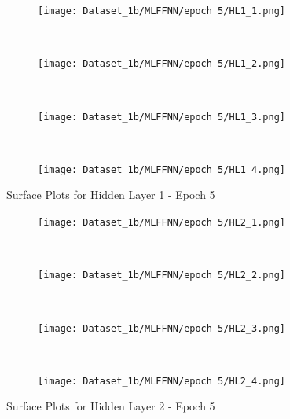 \begin{figure}[!ht]
    \centering
    \begin{subfigure}[h]{0.5\textwidth}
        \centering
        \texttt{[image: Dataset\_1b/MLFFNN/epoch 5/HL1\_1.png]}
    \end{subfigure}%
    ~ 
    \begin{subfigure}[h]{0.5\textwidth}
        \centering
        \texttt{[image: Dataset\_1b/MLFFNN/epoch 5/HL1\_2.png]}
    \end{subfigure}%
    ~
    
    \begin{subfigure}[h]{0.4\textwidth}
        \centering
        \texttt{[image: Dataset\_1b/MLFFNN/epoch 5/HL1\_3.png]}
    \end{subfigure}
    ~
    \begin{subfigure}[h]{0.4\textwidth}
        \centering
        \texttt{[image: Dataset\_1b/MLFFNN/epoch 5/HL1\_4.png]}
    \end{subfigure}
    \caption{Surface Plots for Hidden Layer 1 - Epoch 5}
    \label{fig:13}
\end{figure}




\begin{figure}[!ht]
    \centering
    \begin{subfigure}[h]{0.5\textwidth}
        \centering
        \texttt{[image: Dataset\_1b/MLFFNN/epoch 5/HL2\_1.png]}
    \end{subfigure}%
    ~ 
    \begin{subfigure}[h]{0.5\textwidth}
        \centering
        \texttt{[image: Dataset\_1b/MLFFNN/epoch 5/HL2\_2.png]}
    \end{subfigure}%
    ~
    
    \begin{subfigure}[h]{0.4\textwidth}
        \centering
        \texttt{[image: Dataset\_1b/MLFFNN/epoch 5/HL2\_3.png]}
    \end{subfigure}
    ~
    \begin{subfigure}[h]{0.4\textwidth}
        \centering
        \texttt{[image: Dataset\_1b/MLFFNN/epoch 5/HL2\_4.png]}
    \end{subfigure}
    \caption{Surface Plots for Hidden Layer 2 - Epoch 5}
    \label{fig:13}
\end{figure}



\newpage

